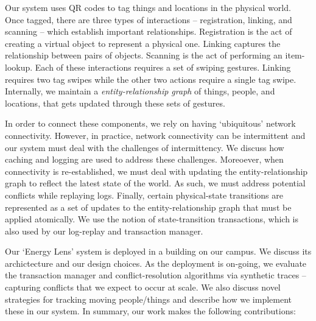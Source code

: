 Our system uses QR codes to tag things and locations in the physical world.  Once tagged, there are three types of interactions -- 
registration, linking, and scanning -- which establish important relationships.  Registration is the act of creating a virtual object 
to represent a physical one.  Linking captures the relationship between pairs of objects.  Scanning is the act of performing an item-lookup.
Each of these interactions requires a set of swiping gestures.  Linking requires two tag swipes while the other two actions
require a single tag swipe.  Internally, we maintain a \emph{entity-relationship graph} of things, people, and locations, that gets
updated through these sets of gestures.

In order to connect these components, we rely on having `ubiquitous' network connectivity.  However, in practice, network
connectivity can be intermittent and our system must deal with the challenges of intermittency.  We discuss how caching
and logging are used to address these challenges.  Moreoever, when connectivity is re-established, we must deal with
updating the entity-relationship graph to reflect the latest state of the world.  As such, we must address potential
conflicts while replaying logs.  Finally, certain physical-state transitions are represented as a set of updates to the entity-relationship
graph that must be applied atomically.  We use the notion of state-transition transactions, which is also used by our
log-replay and transaction manager.

Our `Energy Lens' system is deployed in a building on our campus.  We discuss
its archictecture and our design choices.  As the deployment is on-going, we evaluate the
transaction manager and conflict-resolution algorithms via synthetic traces -- capturing conflicts that we expect to occur
at scale.  %
We also
discuss novel strategies for tracking moving people/things and describe how we implement these in our system.  In summary, our work
makes the following contributions:

